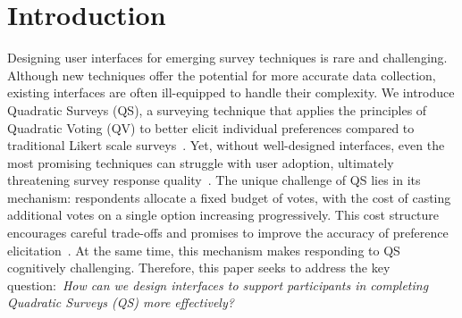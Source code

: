 \section{Introduction}


Designing user interfaces for emerging survey techniques is rare and challenging. Although new techniques offer the potential for more accurate data collection, existing interfaces are often ill-equipped to handle their complexity. We introduce Quadratic Surveys (QS), a surveying technique that applies the principles of Quadratic Voting (QV) to better elicit individual preferences compared to traditional Likert scale surveys~\cite{chengCanShowWhat2021}. Yet, without well-designed interfaces, even the most promising techniques can struggle with user adoption, ultimately threatening survey response quality~\cite{pielotDidYouMisclick2024, kimComparingDataChatbot2019}. The unique challenge of QS lies in its mechanism: respondents allocate a fixed budget of votes, with the cost of casting additional votes on a single option increasing progressively. This cost structure encourages careful trade-offs and promises to improve the accuracy of preference elicitation~\cite{posner2018radical}. At the same time, this mechanism makes responding to QS cognitively challenging. Therefore, this paper seeks to address the key question:~\textit{How can we design interfaces to support participants in completing Quadratic Surveys (QS) more effectively?}


